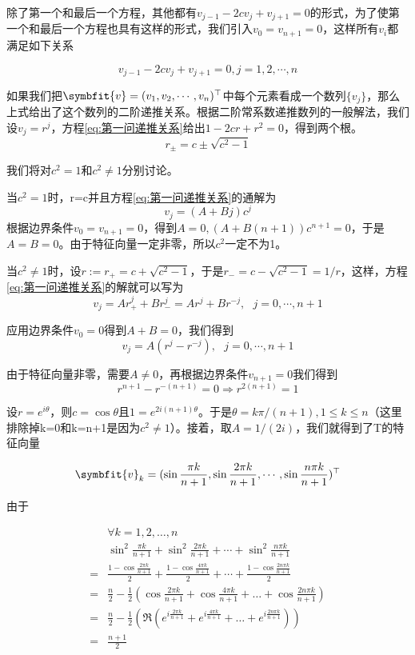 \documentclass[10pt, a4paper]{article}
\newcommand\vbf{\symbfit}
\begin{document}
    除了第一个和最后一个方程，其他都有$ v_{j-1}-2cv_j+v_{j+1}=0$的形式，为了使第一个和最后一个方程也具有这样的形式，我们引入$v_0=v_{n+1}=0$，这样所有$v_i$都满足如下关系

    \begin{equation}
        v_{j-1}-2cv_j+v_{j+1}=0,j=1,2,\cdots,n
    \end{equation}\label{eq:第一问递推关系}

    如果我们把$\vbf{v}=(v_1,v_2,\cdots,v_n)^\top$中每个元素看成一个数列$\{v_j\}$，那么上式给出了这个数列的二阶递推关系。根据二阶常系数递推数列的一般解法，我们设$v_j=r^j$，方程\ref{eq:第一问递推关系}给出$1-2cr+r^2=0$，得到两个根。
    \[r_\pm=c\pm\sqrt{c^2-1}\]

    我们将对$c^2=1$和$c^2\neq 1$分别讨论。

    当$c^2=1$时，r=c并且方程\ref{eq:第一问递推关系}的通解为
    \[v_j=(A+Bj)c^j\]
    根据边界条件$v_0=v_{n+1}=0$，得到$A=0,(A+B(n+1))c^{n+1}=0$，于是$A=B=0$。由于特征向量一定非零，所以$c^2$一定不为1。

    当$c^2\neq1$时，设$r:=r_+=c+\sqrt{c^2-1}$，于是$r_-=c-\sqrt{c^2-1}=1/r$，这样，方程\ref{eq:第一问递推关系}的解就可以写为
    \[v_j=Ar_+^j+Br_-^j=Ar^j+Br^{-j},\text{   }j=0,\cdots,n+1\]

    应用边界条件$v_0=0$得到$A+B=0$，我们得到
    \[v_j=A(r^j-r^{-j}),\text{   }j=0,\cdots,n+1\]

    由于特征向量非零，需要$A\neq0$，再根据边界条件$v_{n+1}=0$我们得到
    \[r^{n+1}-r^{-(n+1)}=0\Longrightarrow r^{2(n+1)}=1\]

    设$r=e^{i\theta}$，则$c=\cos \theta$且$1=e^{2i(n+1)\theta}$。于是$\theta=k\pi/(n+1),1\le k\le n$（这里排除掉k=0和k=n+1是因为$c^2\neq1$）。接着，取$A=1/(2i)$，我们就得到了T的特征向量

    \[\vbf{v}_k=(\sin\frac{\pi k}{n+1},\sin\frac{2\pi k}{n+1},\cdots,\sin\frac{n\pi k}{n+1})^\top\]

    由于

    \begin{align*}
        &\forall k=1,2,\dots,n\\
        &\sin^2\frac{\pi k}{n+1}+\sin^2\frac{2\pi k}{n+1}+\cdots+\sin^2\frac{n\pi k}{n+1}\\
        =&\frac{1-\cos\frac{2\pi k}{n+1}}{2}+\frac{1-\cos\frac{4\pi k}{n+1}}{2}+\cdots+\frac{1-\cos\frac{2n\pi k}{n+1}}{2}\\
        =&\frac{n}{2}-\frac{1}{2}(\cos\frac{2\pi k}{n+1}+\cos\frac{4\pi k}{n+1}+\dots+\cos\frac{2n\pi k}{n+1})\\
        =&\frac{n}{2}-\frac{1}{2}(\Re(e^{i\frac{2\pi k}{n+1}}+e^{i\frac{4\pi k}{n+1}}+\dots+e^{i\frac{2n\pi k}{n+1}}))\\
        =&\frac{n+1}{2}
    \end{align*}
\end{document}
